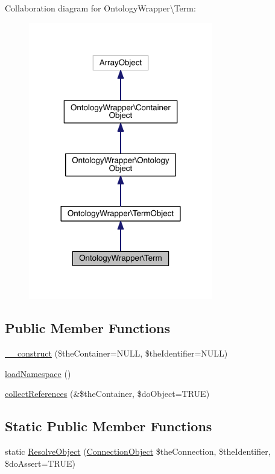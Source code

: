 Collaboration diagram for Ontology\-Wrapper\textbackslash{}Term\-:
\nopagebreak
\begin{figure}[H]
\begin{center}
\leavevmode
\includegraphics[width=228pt]{class_ontology_wrapper_1_1_term__coll__graph}
\end{center}
\end{figure}
\subsection*{Public Member Functions}
\begin{DoxyCompactItemize}
\item 
\hyperlink{class_ontology_wrapper_1_1_term_af15064bcbdb083627b156deb9bce7aea}{\-\_\-\-\_\-construct} (\$the\-Container=N\-U\-L\-L, \$the\-Identifier=N\-U\-L\-L)
\item 
\hyperlink{class_ontology_wrapper_1_1_term_aff4bc870850271310f116c433999a3c5}{load\-Namespace} ()
\item 
\hyperlink{class_ontology_wrapper_1_1_term_a9247b063058e8cdbe94a8a774a70e70e}{collect\-References} (\&\$the\-Container, \$do\-Object=T\-R\-U\-E)
\end{DoxyCompactItemize}
\subsection*{Static Public Member Functions}
\begin{DoxyCompactItemize}
\item 
static \hyperlink{class_ontology_wrapper_1_1_term_a752e5172e2c51dcf9aaf24f49139ec80}{Resolve\-Object} (\hyperlink{class_ontology_wrapper_1_1_connection_object}{Connection\-Object} \$the\-Connection, \$the\-Identifier, \$do\-Assert=T\-R\-U\-E)
\end{DoxyCompactItemize}
